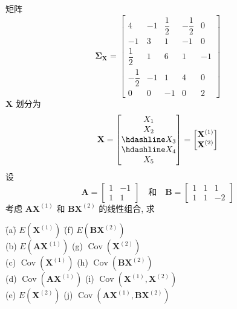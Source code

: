 \noindent 矩阵
\[
\boldsymbol{\Sigma}_{\mathbf{X}}=\begin{bmatrix}
4&-1&\dfrac{1}{2}&-\dfrac{1}{2}&0\\[6pt]
-1&3&1&-1&0\\[6pt]
\dfrac{1}{2}&1&6&1&-1\\[6pt]
-\dfrac{1}{2}&-1&1&4&0\\[6pt]
0&0&-1&0&2
\end{bmatrix}
\]
$\mathbf{X}$ 划分为
\[
\mathbf{X}=\begin{bmatrix}X_{1}\\X_{2}\\\hdashline X_{3}\\\hdashline X_{4}\\X_{5}\end{bmatrix}
=\begin{bmatrix}\mathbf{X}^{(1)}\\\mathbf{X}^{(2)}\end{bmatrix}
\]
设
\[
\mathbf{A}=\begin{bmatrix}1&-1\\1&1\end{bmatrix}\quad\text{和}\quad
\mathbf{B}=\begin{bmatrix}1&1&1\\1&1&-2\end{bmatrix}
\]
考虑 $\mathbf{A}\mathbf{X}^{(1)}$ 和 $\mathbf{B}\mathbf{X}^{(2)}$ 的线性组合, 求
\begin{tabbing}
\hspace*{6em}\=(a)\quad \= $E(\mathbf{X}^{(1)})$ \hspace{3em} \=(f)\quad \= $E(\mathbf{B}\mathbf{X}^{(2)})$\\[2pt]
\>(b)\> $E(\mathbf{A}\mathbf{X}^{(1)})$ \>(g)\> $\operatorname{Cov}(\mathbf{X}^{(2)})$\\[2pt]
\>(c)\> $\operatorname{Cov}(\mathbf{X}^{(1)})$ \>(h)\> $\operatorname{Cov}(\mathbf{B}\mathbf{X}^{(2)})$\\[2pt]
\>(d)\> $\operatorname{Cov}(\mathbf{A}\mathbf{X}^{(1)})$ \>(i)\> $\operatorname{Cov}(\mathbf{X}^{(1)},\mathbf{X}^{(2)})$\\[2pt]
\>(e)\> $E(\mathbf{X}^{(2)})$ \>(j)\> $\operatorname{Cov}(\mathbf{A}\mathbf{X}^{(1)},\mathbf{B}\mathbf{X}^{(2)})$
\end{tabbing}

